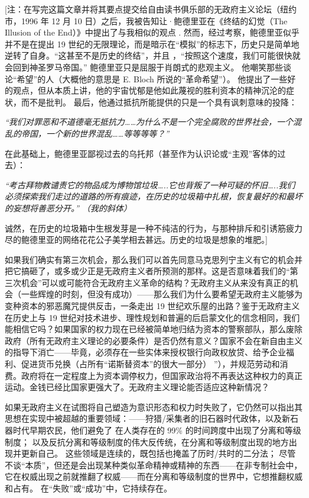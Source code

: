 \documentclass[DIV=12,%
               BCOR=0mm,%
               headinclude=false,%
               footinclude=false,open=any,%
               fontsize=10pt,%
               oneside,%
               paper=210mm:11in]%
               {scrbook}
\newcommand*{\Slash}{\slash\hspace{0pt}}
\begin{document}
[注：在写完这篇文章并将其要点提交给自由读书俱乐部的无政府主义论坛（纽约市，1996 年 12 月 10 日）之后，我被告知让·鲍德里亚在《终结的幻觉（The Illusion of the End）》中提出了与我相似的观点 . 然而，经过考察，鲍德里亚似乎并不是在提出 19 世纪的无限理论，而是暗示在“模拟”的标志下，历史只是简单地逆转了自身。“这甚至不是历史的终结”，并且 ，“按照这个速度，我们可能很快就会回到神圣罗马帝国。” 鲍德里亚只是屈服于肖朗式的悲观主义。 他嘲笑那些谈论“希望”的人（大概他的意思是 E. Bloch 所说的“革命希望”）。 他提出了一些好的观点，但从本质上讲，他的宇宙忧郁是他如此蔑视的胜利资本的精神沉沦的症状，而不是批判。 最后，他通过抵抗所能提供的只是一个具有讽刺意味的投降：


\emph{“我们对罪恶和不道德毫无抵抗力\dots{}\dots{}为什么不是一个完全腐败的世界社会，一个混乱的帝国，一个新的世界混乱\dots{}\dots{}等等等等？”}


在此基础上，鲍德里亚鄙视过去的乌托邦（甚至作为认识论或“主观”客体的过去）：


\emph{“考古拜物教谴责它的物品成为博物馆垃圾\dots{}..它也背叛了一种可疑的怀旧\dots{}..我们必须探索我们走过的道路的所有痕迹，在历史的垃圾箱中扎根，恢复最好的和最坏的妄想将善恶分开。” （我的斜体）}


诚然，在历史的垃圾箱中生根发芽是一种不纯洁的行为，与那种排斥和引诱筋疲力尽的鲍德里亚的网络花花公子美学相去甚远。历史的垃圾是想象的堆肥。]


如果我们确实有第三次机会，那么我们可以首先同意马克思列宁主义有它的机会并把它搞砸了，或多或少正是无政府主义者所预测的那样。这是否意味着我们的“第三次机会”可以或可能符合无政府主义革命的结构？无政府主义从来没有真正的机会（一些辉煌的时刻，但没有成功）——那么我们为什么要希望无政府主义能够为变种资本的邪恶魔咒提供反击，一条走出 19 世纪欢乐屋的出路？鉴于无政府主义在历史上与 19 世纪对技术进步、理性规划和普遍的后启蒙文化的信念相同，我们能相信它吗？如果国家的权力现在已经被简单地归结为资本的警察部队，那么废除政府（所有无政府主义理论的必要条件）是否仍然有意义？国家不会在新自由主义的指导下消亡——毕竟，必须存在一些实体来授权银行向政权放贷、给予企业福利、促进货币兑换（占所有“诺斯替资本”的很大一部分） ”），并规范劳动和消费。政府将在一定程度上为资本调停权力，但国家政治将不再表达这种权力的真正运动。金钱已经比国家更强大了。无政府主义理论能否适应这种新情况？


如果无政府主义在试图将自己塑造为意识形态和权力时失败了，它仍然可以指出其思想在实现中被超越的重要领域：——狩猎\Slash{}采集者的旧石器时代政体，以及新石器时代早期农民，他们避免了 在人类存在的 99\% 的时间跨度中出现了分离和等级制度； 以及反抗分离和等级制度的伟大反传统，在分离和等级制度出现的地方出现并更新自己。 这些领域是连续的，既包括也掩盖了历时\Slash{}共时的二分法； 尽管不谈“本质”，但还是会出现某种类似革命精神或精神的东西——在非专制社会中，它在权威出现之前就推翻了权威——而在分离和等级制度的世界中，它想推翻权威和占有。 在“失败”或“成功”中，它持续存在。
\end{document}
